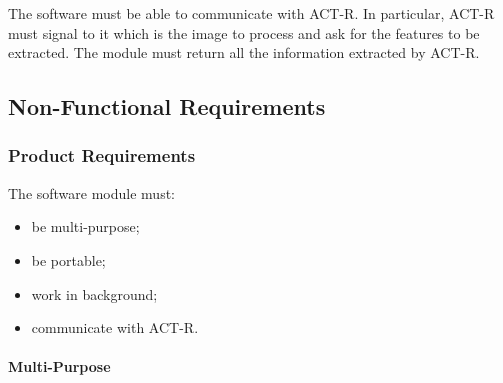 		The software must be able to communicate with ACT-R. 
		In particular, ACT-R must signal to it which is the image to process and ask for the features to be extracted. The module must return all the information extracted by ACT-R.

		\subsection{Non-Functional Requirements}

			\subsubsection{Product Requirements}
			The software module must:
			\begin{itemize}
				\item be multi-purpose;
				\item be portable;
			    	\item work in background;			
				\item communicate with \mbox{ACT-R}.			
			\end{itemize}
			

				\paragraph{Multi-Purpose}

